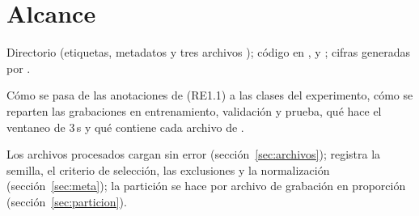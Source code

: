 \documentclass[12pt,a4paper]{article}
\begin{document}

\section{Alcance}

 Directorio  (etiquetas, metadatos y
tres archivos ); código en ,
 y
; cifras generadas por
.

 Cómo se pasa de las \nAnnotationsCleaned{} anotaciones de
 (RE1.1) a las \nClasses{} clases del experimento, cómo se reparten las
grabaciones en entrenamiento, validación y prueba, qué hace el ventaneo de 3\,s y qué contiene
cada archivo de .

 Los archivos procesados cargan sin error
(sección~\ref{sec:archivos});  registra la semilla, el criterio de selección,
las exclusiones y la normalización (sección~\ref{sec:meta}); la partición se hace por archivo
de grabación en proporción \splitRatios{} (sección~\ref{sec:particion}).
\end{document}
